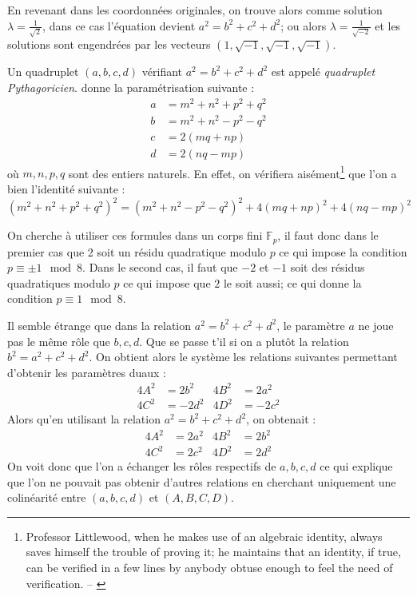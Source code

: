 \documentclass[a4paper]{article}
\theoremstyle{definition}
\theoremstyle{remark}
\numberwithin{equation}{section}
\begin{document}
En revenant dans les coordonnées originales, on trouve alors comme solution $\lambda = \frac{1}{\sqrt 2}$, dans ce cas l'équation devient $a^2 = b^2 + c^2 + d^2$; ou alors $\lambda = \frac{1}{\sqrt{-2}}$ et les solutions sont engendrées par les vecteurs $(1,\sqrt{-1},\sqrt{-1},\sqrt{-1})$.

Un quadruplet $(a,b,c,d)$ vérifiant $a^2 = b^2 + c^2 + d^2$ est appelé \emph{quadruplet Pythagoricien}. \citet{mordell} donne la paramétrisation suivante :
\begin{align*}
a &= m^2 + n^2 + p^2 + q^2 \\
b &= m^2 + n^2 - p^2 - q^2 \\
c &= 2(mq+np) \\
d &= 2(nq-mp)
\end{align*}
où $m,n,p,q$ sont des entiers naturels. En effet, on vérifiera aisément\footnote{Professor Littlewood, when he makes use of an algebraic identity, always saves himself the trouble of proving it;
he maintains that an identity, if true, can be verified in a few
lines by anybody obtuse enough to feel the need of verification. -- \citet{dyson}} que l'on a bien l'identité suivante :
$$(m^2 + n^2 + p^2 + q^2)^2 = (m^2 + n^2 - p^2 - q^2)^2 + 4(mq+np)^2 + 4(nq-mp)^2$$

On cherche à utiliser ces formules dans un corps fini $\mathbb{F}_p$, il faut donc dans le premier cas que 2 soit un résidu quadratique modulo $p$ ce qui impose la condition $p \equiv \pm 1 \mod{8}$. Dans le second cas, il faut que $-2$ et $-1$ soit des résidus quadratiques modulo $p$ ce qui impose que $2$ le soit aussi; ce qui donne la condition $p \equiv 1 \mod{8}$.

Il semble étrange que dans la relation $a^2 = b^2 + c^2 + d^2$, le paramètre $a$ ne joue pas le même rôle que $b,c,d$. Que se passe t'il si on a plutôt la relation $b^2 = a^2 + c^2 + d^2$. On obtient alors le système les relations suivantes permettant d'obtenir les paramètres duaux :
\begin{align*}
4A^2 &= 2b^2  &4B^2 &= 2a^2 \\
4C^2 &= -2d^2  &4D^2 &= -2c^2
\end{align*}
Alors qu'en utilisant la relation $a^2 = b^2 + c^2 + d^2$, on obtenait :
\begin{align*}
4A^2 &= 2a^2  &4B^2 &= 2b^2 \\
4C^2 &= 2c^2  &4D^2 &= 2d^2
\end{align*}
On voit donc que l'on a échanger les rôles respectifs de $a,b,c,d$ ce qui explique que l'on ne pouvait pas obtenir d'autres relations en cherchant uniquement une colinéarité entre $(a,b,c,d)$ et $(A,B,C,D)$.
\end{document}
